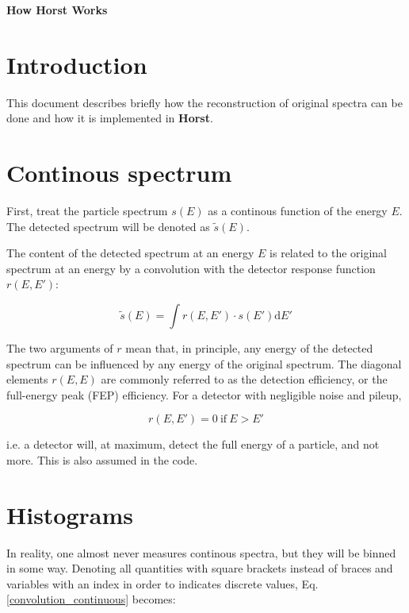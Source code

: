 \documentclass{article}
\begin{document}
\begin{titlepage}
\Huge
	\textbf{How Horst Works}
\end{titlepage}

\tableofcontents

\newpage

\section{Introduction}
This document describes briefly how the reconstruction of original spectra can be done and how it is implemented in \textbf{Horst}.

\section{Continous spectrum}
First, treat the particle spectrum $s(E)$ as a continous function of the energy $E$. 
The detected spectrum will be denoted as $\tilde{s}(E)$.

The content of the detected spectrum at an energy $E$ is related to the original spectrum at an energy by a convolution with the detector response function $r(E, E')$:

\begin{equation}
\label{convolution_continuous}
	\tilde{s}(E) = \int r(E, E') \cdot s(E') \mathrm{d}E' 
\end{equation}

The two arguments of $r$ mean that, in principle, any energy of the detected spectrum can be influenced by any energy of the original spectrum.
The diagonal elements $r(E,E)$ are commonly referred to as the detection efficiency, or the full-energy peak (FEP) efficiency.
For a detector with negligible noise and pileup, 

\begin{equation}
	\label{response_condition}
	r(E, E') = 0 ~\mathrm{if}~ E > E'
\end{equation}

i.e. a detector will, at maximum, detect the full energy of a particle, and not more. This is also assumed in the code.

\section{Histograms}
In reality, one almost never measures continous spectra, but they will be binned in some way.
Denoting all quantities with square brackets instead of braces and variables with an index in order to indicates discrete values, Eq. \ref{convolution_continuous} becomes:
\end{document}
